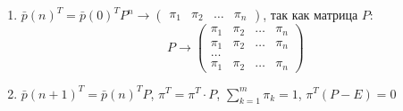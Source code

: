 \begin{corollary}
  \begin{enumerate}
    \item $\bar{p} (n)^T = \bar{p}(0)^T P^n \to
      \begin{pmatrix} \pi_1 & \pi_2 & \dots & \pi_n \end{pmatrix}$, так как матрица $P$:
      \[
        P \to \begin{pmatrix}
          \pi_1 & \pi_2 & \dots & \pi_n \\
          \pi_1 & \pi_2 & \dots & \pi_n \\
          \dots \\
          \pi_1 & \pi_2 & \dots & \pi_n
        \end{pmatrix} 
      \]

    \item $\bar{p}(n+1)^T = \bar{p}(n)^T P$, $\pi^T = \pi^T \cdot P$, $\sum_{k=1}^m \pi_k = 1$, 
      $\pi^T (P - E) = 0$
  \end{enumerate}
\end{corollary}
